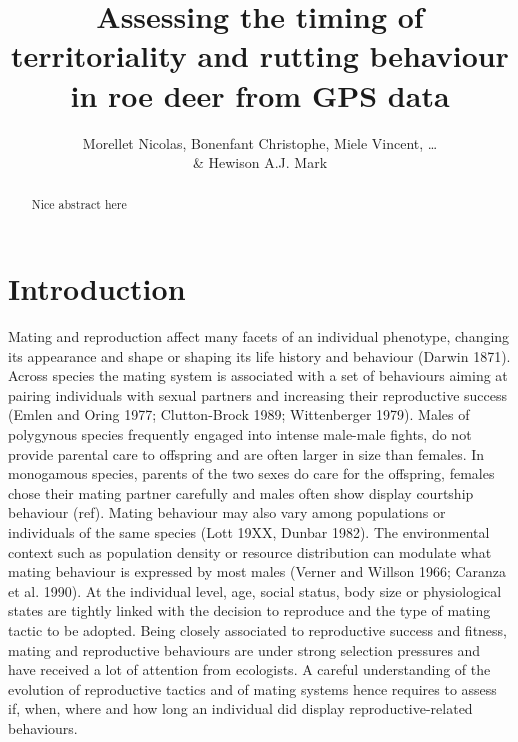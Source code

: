 \documentclass[a4paper,11pt]{article}
\title{Assessing the timing of territoriality and rutting behaviour in
  roe deer from GPS data}
\author{Morellet Nicolas, Bonenfant Christophe, Miele Vincent,
  \ldots\\ \& Hewison A.J. Mark}
\begin{document}
\maketitle

\newpage
\begin{abstract}
Nice abstract here
\end{abstract}

\newpage
\section*{Introduction}

Mating and reproduction affect many facets of an individual phenotype,
changing its appearance and shape or shaping its life history and
behaviour (Darwin 1871).  Across species
the mating system is associated with a set of behaviours aiming at
pairing individuals with sexual partners and increasing their
reproductive success (Emlen and Oring 1977; Clutton-Brock 1989;
Wittenberger 1979). Males of polygynous species frequently engaged
into intense male-male fights, do not provide parental care to
offspring and are often larger in size than females. In monogamous
species, parents of the two sexes do care for the offspring, females
chose their mating partner carefully and males often show display
courtship behaviour (ref). Mating behaviour may also vary among
populations or individuals of the same species (Lott 19XX, Dunbar
1982). The environmental context such as population density or
resource distribution can modulate what mating behaviour is expressed
by most males (Verner and Willson 1966; Caranza et al. 1990). At the
individual level, age, social status, body size or physiological
states are tightly linked with the decision to reproduce and the type
of mating tactic to be adopted. Being closely associated to
reproductive success and fitness, mating and reproductive behaviours
are under strong selection pressures and have received a lot of
attention from ecologists. A careful understanding of the evolution of
reproductive tactics and of mating systems hence requires to assess
if, when, where and how long an individual did display
reproductive-related behaviours.
\end{document}
